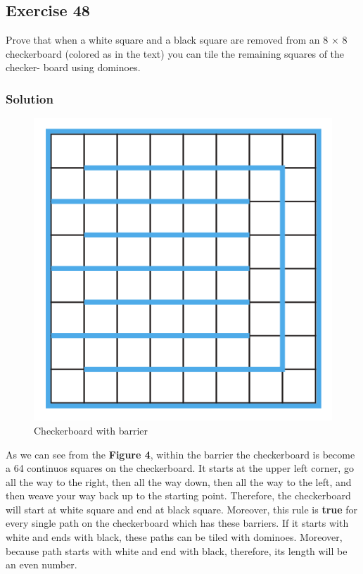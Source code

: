 \documentclass{article}
\begin{document}
\subsection*{Exercise 48}
Prove that when a white square and a black square are removed from an 8 \(\times\) 8 checkerboard (colored as in the text) you can tile the remaining squares of the checker- board using dominoes.
\subsubsection*{Solution}
\begin{figure}
    \begin{center}
        \includegraphics*{8x8CheckerBoardBarrier.png}
        \caption{Checkerboard with barrier}
    \end{center}
\end{figure}
As we can see from the \textbf{Figure 4}, within the barrier the checkerboard
is become a 64 continuos squares on the checkerboard. It starts at the upper
 left corner, go all the way to the right, then all the way down, then all
  the way to the left, and then weave your way back up to the starting point.
Therefore, the checkerboard will start at white square and end at black square.
Moreover, this rule is \textbf{true} for every single path on the checkerboard
which has these barriers. If it starts with white and ends with black, these paths
can be tiled with dominoes. Moreover, because path starts with white and
end with black, therefore, its length will be an even number.\\
\end{document}
